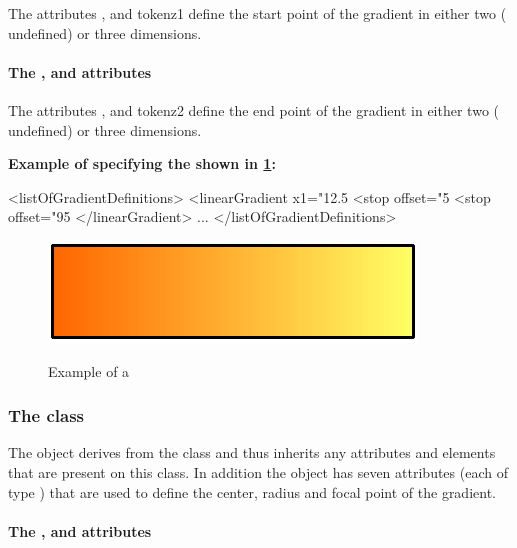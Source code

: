 The attributes ,  and token{z1} define the start point of the gradient in either two ( undefined) or three dimensions.

\paragraph{The \fixttspace{}, \fixttspace{} and \fixttspace{} attributes}

The attributes ,  and token{z2} define the end point of the gradient in either two ( undefined) or three dimensions.



{
  {\bf
Example of specifying the \LinearGradient shown in \ref{fig:lingrad}:
}
}
{\footnotesize
\begin{example}
<listOfGradientDefinitions>
  <linearGradient x1="12.5%
    <stop offset="5%
    <stop offset="95%
  </linearGradient>
        ...
</listOfGradientDefinitions>
\end{example}
}

\begin{figure}[h!]
  \centering
  \includegraphics[scale=0.5]{figures/lingrad01.pdf}\\
  \caption{Example of a \LinearGradient}
  \label{fig:lingrad}
\end{figure}


\subsubsection{The  class}
\label{radialgradient-class}


The \RadialGradient object derives from the \GradientBase class and thus
inherits any attributes and elements that are present on this class.
In addition the \RadialGradient object has seven attributes (each of type \RelAbsVector) that are used to define the center, radius and focal point of the gradient.



\paragraph{The \fixttspace{}, \fixttspace{} and \fixttspace{} attributes}

